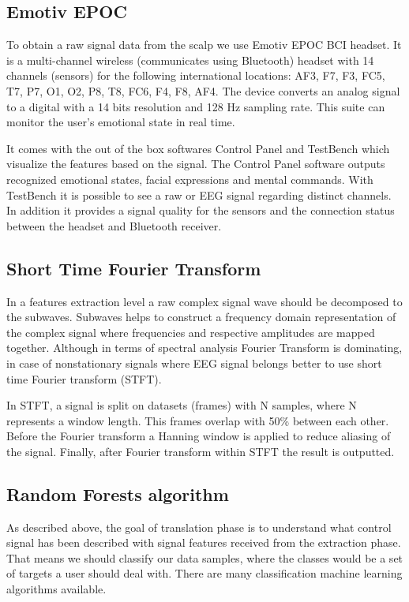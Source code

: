 \documentclass[12pt]{article}
\begin{document}
\subsection{Emotiv EPOC}

To obtain a raw signal data from the scalp we use Emotiv EPOC BCI headset. It is a multi-channel wireless (communicates using Bluetooth) headset with 14 channels (sensors) for the following international locations: AF3, F7, F3, FC5, T7, P7, O1, O2, P8, T8, FC6, F4, F8, AF4. The device converts an analog signal to a digital with a 14 bits resolution and 128 Hz sampling rate. This suite can monitor the user's emotional state in real time.\cite{emotiv}

It comes with the out of the box softwares Control Panel and TestBench which visualize the features based on the signal. The Control Panel software outputs recognized emotional states, facial expressions and mental commands. With TestBench it is possible to see a raw or EEG signal regarding distinct channels. In addition it provides a signal quality for the sensors and the connection status between the headset and Bluetooth receiver.
\subsection{Short Time Fourier Transform}

In a features extraction level a raw complex signal wave should be decomposed to the subwaves. Subwaves helps to construct a frequency domain representation of the complex signal where frequencies and respective amplitudes are mapped together. Although in terms of spectral analysis Fourier Transform is dominating, in case of nonstationary signals where EEG signal belongs better to use short time Fourier transform (STFT).\cite{alfahoum_fft}

In STFT, a signal is split on datasets (frames) with N samples, where N represents a window length. This frames overlap with 50\% between each other. Before the Fourier transform a Hanning window is applied to reduce aliasing of the signal. Finally, after Fourier transform within STFT the result is outputted.

\subsection{Random Forests algorithm}

As described above, the goal of translation phase is to understand what control signal has been described with signal features received from the extraction phase. That means we should classify our data samples, where the classes would be a set of targets a user should deal with. There are many classification machine learning algorithms available. 
\end{document}
